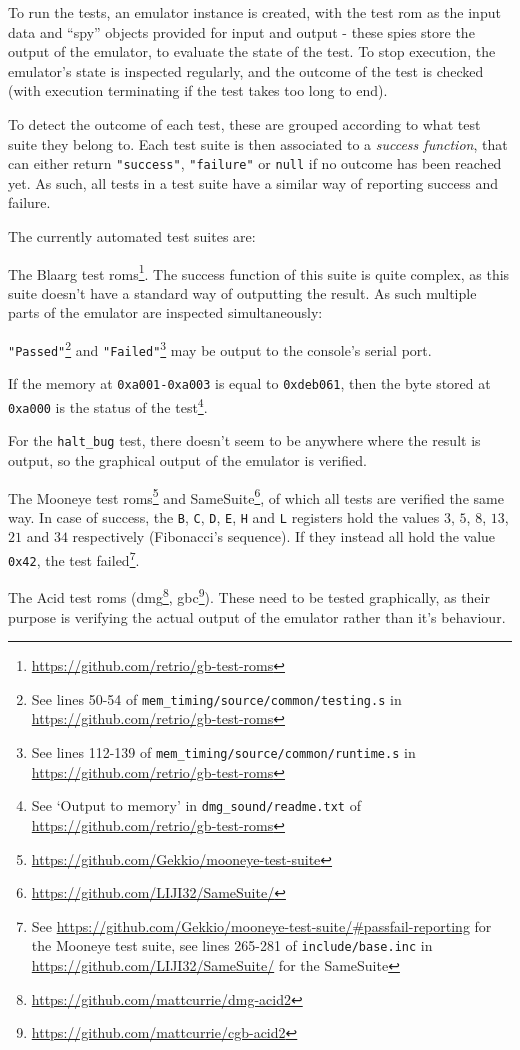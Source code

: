 \documentclass[11pt]{report}
\newcommand{\ftnt}[1]{\footnote{\url{#1}}}
\begin{document}
To run the tests, an emulator instance is created, with the test \gls{rom} as the input data and ``spy'' objects provided for input and output - these spies store the output of the emulator, to evaluate the state of the test. To stop execution, the emulator's state is inspected regularly, and the outcome of the test is checked (with execution terminating if the test takes too long to end).

To detect the outcome of each test, these are grouped according to what test suite they belong to. Each test suite is then associated to a \textit{success function}, that can either return \texttt{"success"}, \texttt{"failure"} or \texttt{null} if no outcome has been reached yet. As such, all tests in a test suite have a similar way of reporting success and failure.

The currently automated test suites are:
\begin{compactitem}
	\item The Blaarg test \glspl{rom}\ftnt{https://github.com/retrio/gb-test-roms}. The success function of this suite is quite complex, as this suite doesn't have a standard way of outputting the result. As such multiple parts of the emulator are inspected simultaneously:
		\begin{compactitem}
			\item \texttt{"Passed"}\footnote{See lines 50-54 of \texttt{mem\_timing/source/common/testing.s} in \url{https://github.com/retrio/gb-test-roms}} and \texttt{"Failed"}\footnote{See lines 112-139 of \texttt{mem\_timing/source/common/runtime.s} in \url{https://github.com/retrio/gb-test-roms}} may be output to the console's serial port.
			\item If the memory at \texttt{0xa001-0xa003} is equal to \texttt{0xdeb061}, then the byte stored at \texttt{0xa000} is the status of the test\footnote{See `Output to memory' in \texttt{dmg\_sound/readme.txt} of \url{https://github.com/retrio/gb-test-roms}}.
			\item For the \texttt{halt\_bug} test, there doesn't seem to be anywhere where the result is output, so the graphical output of the emulator is verified.
		\end{compactitem}
	\item The Mooneye test \glspl{rom}\ftnt{https://github.com/Gekkio/mooneye-test-suite} and SameSuite\ftnt{https://github.com/LIJI32/SameSuite/}, of which all tests are verified the same way. In case of success, the \texttt{B}, \texttt{C}, \texttt{D}, \texttt{E}, \texttt{H} and \texttt{L} registers hold the values $3$, $5$, $8$, $13$, $21$ and $34$ respectively (Fibonacci's sequence). If they instead all hold the value \texttt{0x42}, the test failed\footnote{See \url{https://github.com/Gekkio/mooneye-test-suite/\#passfail-reporting} for the Mooneye test suite, see lines 265-281 of \texttt{include/base.inc} in \url{https://github.com/LIJI32/SameSuite/} for the SameSuite}.
	\item The Acid test \glspl{rom} (\gls{dmg}\ftnt{https://github.com/mattcurrie/dmg-acid2}, \gls{gbc}\ftnt{https://github.com/mattcurrie/cgb-acid2}). These need to be tested graphically, as their purpose is verifying the actual output of the emulator rather than it's behaviour.
\end{compactitem}
\end{document}

